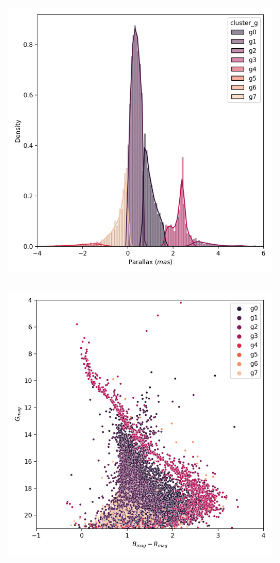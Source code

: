 \documentclass[11pt,a4paper,english,twocolumn]{article}
\begin{document}
\begin{figure}[htbp]
\begin{subfigure}{\columnwidth}
\begin{subfigure}[t]{0.30\textwidth}
    \end{subfigure}
    \hfill
    \begin{subfigure}[t]{0.30\textwidth}
      \centering
      \includegraphics[width=\textwidth]{../figures/ngc_2516/kmeans_parallax_ngc_2516.png}
    \end{subfigure}
    \hfill
    \begin{subfigure}[t]{0.30\textwidth}
      \centering
      \includegraphics[width=\textwidth]{../figures/ngc_2516/kmeans_hr_diagram_ngc_2516.png}

\end{subfigure}
\end{subfigure}
\end{figure}
\end{document}
